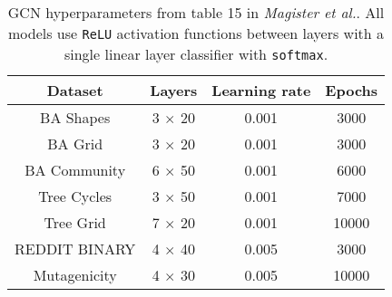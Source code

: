 \begin{table}[h]
    \centering
    \captionsetup{width=.9\textwidth}
    \begin{tabular}{c|ccc}
        \textbf{Dataset} &
        \textbf{Layers} &
        \textbf{Learning rate} &
        \textbf{Epochs} \\
        \midrule
        BA Shapes       & 3 $\times$ 20 & 0.001 & 3000 \\
        BA Grid         & 3 $\times$ 20 & 0.001 & 3000 \\
        BA Community    & 6 $\times$ 50 & 0.001 & 6000 \\
        Tree Cycles     & 3 $\times$ 50 & 0.001 & 7000 \\
        Tree Grid       & 7 $\times$ 20 & 0.001 & 10000 \\
        \midrule
        REDDIT BINARY   & 4 $\times$ 40 & 0.005 & 3000 \\
        Mutagenicity    & 4 $\times$ 30 & 0.005 & 10000 \\
    \end{tabular}
    \caption{GCN hyperparameters from table 15 in \textit{Magister et al.}\cite{magister2021gcexplainer}. All models use \texttt{ReLU} activation functions between layers with a single linear layer classifier with \texttt{softmax}.}
    \label{tab:GCN-params}
\end{table}

